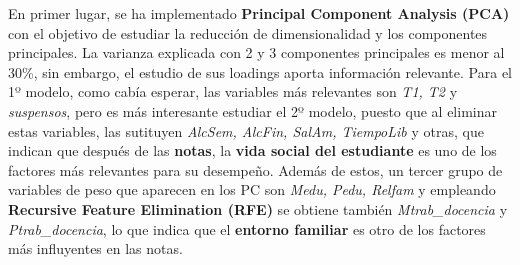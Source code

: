 \documentclass{article}
\begin{document}
En primer lugar, se ha implementado \textbf{Principal Component Analysis (PCA)} con el objetivo de estudiar la reducción de dimensionalidad y los componentes principales. 
La varianza explicada con 2 y 3 componentes principales es menor al 30\%, sin embargo, el estudio de sus loadings aporta información relevante. Para el 1º modelo, como cabía esperar, las variables
más relevantes son \textit{T1, T2} y \textit{suspensos}, pero es más interesante estudiar el 2º modelo, puesto que al eliminar estas variables, las sutituyen \textit{AlcSem, AlcFin, SalAm, TiempoLib} y otras, que
 indican que después de las \textbf{notas}, la \textbf{vida social del estudiante} es uno de los factores más relevantes para su desempeño. Además de estos, un tercer grupo de variables de peso que aparecen en los PC son \textit{Medu, Pedu, Relfam} y empleando \textbf{Recursive Feature Elimination (RFE)} 
se obtiene también \textit{Mtrab\_docencia} y \textit{Ptrab\_docencia}, lo que indica que el \textbf{entorno familiar} es otro de los factores más influyentes en las notas. 
\end{document}
